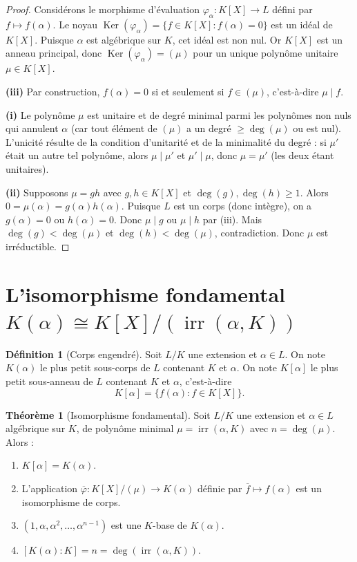 \documentclass[12pt,a4paper,openany]{book}
\theoremstyle{definition}
\newtheorem{definition}{Définition}[chapter]
\newtheorem{theoreme}{Théorème}[chapter]
\newcommand{\Ker}{\operatorname{Ker}}
\newcommand{\irr}{\operatorname{irr}}
\renewcommand{\deg}{\operatorname{deg}}
\begin{document}
\begin{proof}
Considérons le morphisme d'évaluation
$\varphi_\alpha \colon K[X] \to L$ défini par $f \mapsto f(\alpha)$. Le noyau
$\Ker(\varphi_\alpha) = \{f \in K[X] : f(\alpha) = 0\}$ est un idéal de $K[X]$.
Puisque $\alpha$ est algébrique sur $K$, cet idéal est non nul. Or $K[X]$ est un
anneau principal, donc $\Ker(\varphi_\alpha) = (\mu)$ pour un unique polynôme
unitaire $\mu \in K[X]$.

\textbf{(iii)} Par construction, $f(\alpha) = 0$ si et seulement si
$f \in (\mu)$, c'est-à-dire $\mu \mid f$.

\textbf{(i)} Le polynôme $\mu$ est unitaire et de degré minimal parmi les
polynômes non nuls qui annulent $\alpha$ (car tout élément de $(\mu)$ a un degré
$\geq \deg(\mu)$ ou est nul). L'unicité résulte de la condition d'unitarité et de
la minimalité du degré : si $\mu'$ était un autre tel polynôme, alors $\mu \mid
\mu'$ et $\mu' \mid \mu$, donc $\mu = \mu'$ (les deux étant unitaires).

\textbf{(ii)} Supposons $\mu = gh$ avec $g, h \in K[X]$ et $\deg(g), \deg(h) \geq
1$. Alors $0 = \mu(\alpha) = g(\alpha)h(\alpha)$. Puisque $L$ est un corps (donc
intègre), on a $g(\alpha) = 0$ ou $h(\alpha) = 0$. Donc $\mu \mid g$ ou $\mu \mid
h$ par (iii). Mais $\deg(g) < \deg(\mu)$ et $\deg(h) < \deg(\mu)$, contradiction.
Donc $\mu$ est irréductible.
\end{proof}

\section{L'isomorphisme fondamental $K(\alpha) \cong K[X]/(\irr(\alpha,K))$}
\label{sec:iso-fondamental}

\begin{definition}[Corps engendré]\label{def:corps-engendre}
Soit $L/K$ une extension et $\alpha \in L$. On note $K(\alpha)$ le plus petit
sous-corps de $L$ contenant $K$ et $\alpha$. On note $K[\alpha]$ le plus petit
sous-anneau de $L$ contenant $K$ et $\alpha$, c'est-à-dire
\[
  K[\alpha] = \{f(\alpha) : f \in K[X]\}.
\]
\end{definition}

\begin{theoreme}[Isomorphisme fondamental]\label{thm:iso-fondamental}
Soit $L/K$ une extension et $\alpha \in L$ algébrique sur $K$, de polynôme
minimal $\mu = \irr(\alpha, K)$ avec $n = \deg(\mu)$. Alors :
\begin{enumerate}[label=(\roman*)]
  \item $K[\alpha] = K(\alpha)$.
  \item L'application $\overline{\varphi} \colon K[X]/(\mu) \to K(\alpha)$
    définie par $\overline{f} \mapsto f(\alpha)$ est un isomorphisme de corps.
  \item $(1, \alpha, \alpha^2, \dots, \alpha^{n-1})$ est une $K$-base de
    $K(\alpha)$.
  \item $[K(\alpha):K] = n = \deg(\irr(\alpha, K))$.
\end{enumerate}
\end{theoreme}
\end{document}
